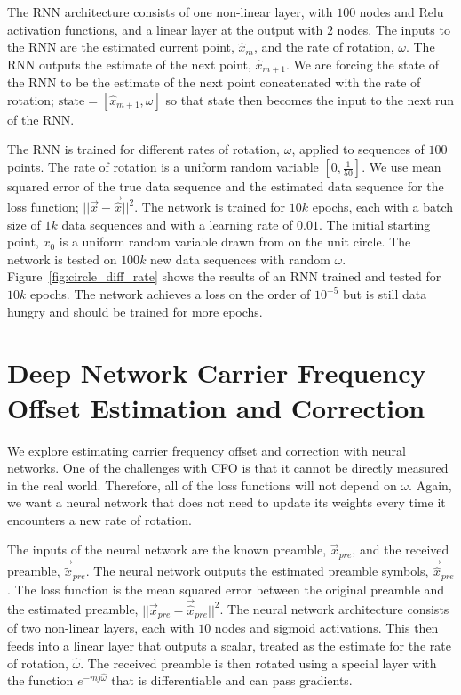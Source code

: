 The RNN architecture consists of one non-linear layer, with $100$ nodes and Relu activation functions, and a linear layer at the output with $2$ nodes. The inputs to the RNN are the estimated current point, $\hat{x}_m$, and the rate of rotation, $\omega$.  The RNN outputs the estimate of the next point, $\hat{x}_{m+1}$.  We are forcing the state of the RNN to be the estimate of the next point concatenated with the rate of rotation; $\text{state} = [\hat{x}_{m+1},\omega]$ so that state then becomes the input to the next run of the RNN.

The RNN is trained for different rates of rotation, $\omega$, applied to sequences of $100$ points.
The rate of rotation is a uniform random variable $[0,\frac{1}{50}]$.
We use mean squared error of the true data sequence and the estimated data sequence for the loss function; $||\vec{x}-\vec{\hat{x}}||^2$.  The network is trained for $10k$ epochs, each with a batch size of $1k$ data sequences and with a learning rate of $0.01$.  The initial starting point, $x_0$ is a uniform random variable drawn from on the unit circle.
The network is tested on $100k$ new data sequences with random $\omega$.
Figure~\ref{fig:circle_diff_rate} shows the results of an RNN trained and tested for $10k$ epochs.  The network achieves a loss on the order of $10^{-5}$ but is still data hungry and should be trained for more epochs.


\section{Deep Network Carrier Frequency Offset Estimation and Correction}

We explore estimating carrier frequency offset and correction with neural networks.
One of the challenges with CFO is that it cannot be directly measured in the real world.  
Therefore, all of the loss functions will not depend on $\omega$.
Again, we want a neural network that does not need to update its weights every time it encounters a new rate of rotation.

The inputs of the neural network are the known preamble, $\vec{x}_{pre}$, and the received preamble, $\vec{\tilde{x}}_{pre}$.  The neural network outputs the estimated preamble symbols, $\vec{\hat{x}}_{pre}$.  
The loss function is the mean squared error between the original preamble and the estimated preamble, $||\vec{x}_{pre}-\vec{\hat{x}}_{pre}||^2$.
The neural network architecture consists of two non-linear layers, each with $10$ nodes and sigmoid activations.  This then feeds into a linear layer that outputs a scalar, treated as the estimate for the rate of rotation, $\hat{\omega}$. 
The received preamble is then rotated using a special layer with the function $e^{-mj\hat{\omega}}$ that is differentiable and can pass gradients.

